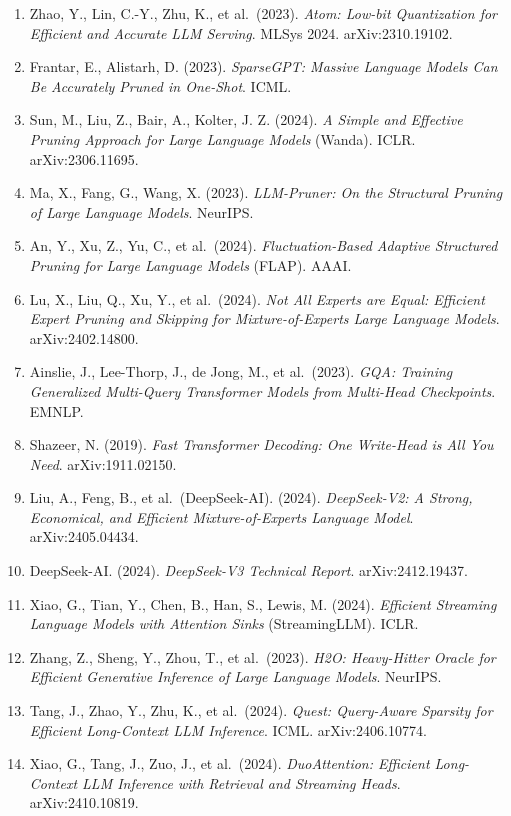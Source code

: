 \begin{enumerate}
\item
  Zhao, Y., Lin, C.-Y., Zhu, K., et al.~(2023). \emph{Atom: Low-bit Quantization for Efficient and Accurate LLM Serving}. MLSys 2024. arXiv:2310.19102.
\item
  Frantar, E., Alistarh, D. (2023). \emph{SparseGPT: Massive Language Models Can Be Accurately Pruned in One-Shot}. ICML.
\item
  Sun, M., Liu, Z., Bair, A., Kolter, J. Z. (2024). \emph{A Simple and Effective Pruning Approach for Large Language Models} (Wanda). ICLR. arXiv:2306.11695.
\item
  Ma, X., Fang, G., Wang, X. (2023). \emph{LLM-Pruner: On the Structural Pruning of Large Language Models}. NeurIPS.
\item
  An, Y., Xu, Z., Yu, C., et al.~(2024). \emph{Fluctuation-Based Adaptive Structured Pruning for Large Language Models} (FLAP). AAAI.
\item
  Lu, X., Liu, Q., Xu, Y., et al.~(2024). \emph{Not All Experts are Equal: Efficient Expert Pruning and Skipping for Mixture-of-Experts Large Language Models}. arXiv:2402.14800.
\item
  Ainslie, J., Lee-Thorp, J., de Jong, M., et al.~(2023). \emph{GQA: Training Generalized Multi-Query Transformer Models from Multi-Head Checkpoints}. EMNLP.
\item
  Shazeer, N. (2019). \emph{Fast Transformer Decoding: One Write-Head is All You Need}. arXiv:1911.02150.
\item
  Liu, A., Feng, B., et al.~(DeepSeek-AI). (2024). \emph{DeepSeek-V2: A Strong, Economical, and Efficient Mixture-of-Experts Language Model}. arXiv:2405.04434.
\item
  DeepSeek-AI. (2024). \emph{DeepSeek-V3 Technical Report}. arXiv:2412.19437.
\item
  Xiao, G., Tian, Y., Chen, B., Han, S., Lewis, M. (2024). \emph{Efficient Streaming Language Models with Attention Sinks} (StreamingLLM). ICLR.
\item
  Zhang, Z., Sheng, Y., Zhou, T., et al.~(2023). \emph{H2O: Heavy-Hitter Oracle for Efficient Generative Inference of Large Language Models}. NeurIPS.
\item
  Tang, J., Zhao, Y., Zhu, K., et al.~(2024). \emph{Quest: Query-Aware Sparsity for Efficient Long-Context LLM Inference}. ICML. arXiv:2406.10774.
\item
  Xiao, G., Tang, J., Zuo, J., et al.~(2024). \emph{DuoAttention: Efficient Long-Context LLM Inference with Retrieval and Streaming Heads}. arXiv:2410.10819.

\end{enumerate}
